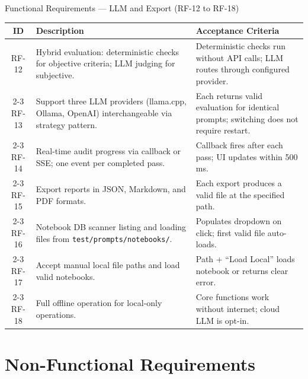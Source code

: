 \documentclass[aspectratio=169,11pt]{beamer}
\begin{document}
\begin{frame}[shrink]{Functional Requirements --- LLM and Export (RF-12 to RF-18)}
  \centering
  \scriptsize
  \renewcommand{\arraystretch}{0.85}
  \begin{tabularx}{\textwidth}{c X p{4.5cm}}
    \toprule
    \textbf{ID} & \textbf{Description} & \textbf{Acceptance Criteria} \\
    \midrule
    RF-12 & Hybrid evaluation: deterministic checks for objective criteria; LLM judging for subjective. & Deterministic checks run without API calls; LLM routes through configured provider. \\
    \cmidrule{2-3}
    RF-13 & Support three LLM providers (llama.cpp, Ollama, OpenAI) interchangeable via strategy pattern. & Each returns valid evaluation for identical prompts; switching does not require restart. \\
    \cmidrule{2-3}
    RF-14 & Real-time audit progress via callback or SSE; one event per completed pass. & Callback fires after each pass; UI updates within 500\,ms. \\
    \cmidrule{2-3}
    RF-15 & Export reports in JSON, Markdown, and PDF formats. & Each export produces a valid file at the specified path. \\
    \cmidrule{2-3}
    RF-16 & Notebook DB scanner listing and loading files from \texttt{test/prompts/notebooks/}. & Populates dropdown on click; first valid file auto-loads. \\
    \cmidrule{2-3}
    RF-17 & Accept manual local file paths and load valid notebooks. & Path + ``Load Local'' loads notebook or returns clear error. \\
    \cmidrule{2-3}
    RF-18 & Full offline operation for local-only operations. & Core functions work without internet; cloud LLM is opt-in. \\
    \bottomrule
  \end{tabularx}
\end{frame}

\section{Non-Functional Requirements}
\end{document}
